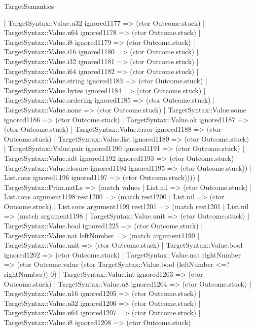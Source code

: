 \begin{lexlean}{TargetSemantics}
\begin{semanticmodule}
{            | TargetSyntax::Value.u32 ignored1177 => (ctor Outcome.stuck)
            | TargetSyntax::Value.u64 ignored1178 => (ctor Outcome.stuck)
            | TargetSyntax::Value.i8 ignored1179 => (ctor Outcome.stuck)
            | TargetSyntax::Value.i16 ignored1180 => (ctor Outcome.stuck)
            | TargetSyntax::Value.i32 ignored1181 => (ctor Outcome.stuck)
            | TargetSyntax::Value.i64 ignored1182 => (ctor Outcome.stuck)
            | TargetSyntax::Value.string ignored1183 => (ctor Outcome.stuck)
            | TargetSyntax::Value.bytes ignored1184 => (ctor Outcome.stuck)
            | TargetSyntax::Value.ordering ignored1185 => (ctor Outcome.stuck)
            | TargetSyntax::Value.none => (ctor Outcome.stuck)
            | TargetSyntax::Value.some ignored1186 => (ctor Outcome.stuck)
            | TargetSyntax::Value.ok ignored1187 => (ctor Outcome.stuck)
            | TargetSyntax::Value.error ignored1188 => (ctor Outcome.stuck)
            | TargetSyntax::Value.list ignored1189 => (ctor Outcome.stuck)
            | TargetSyntax::Value.pair ignored1190 ignored1191 => (ctor Outcome.stuck)
            | TargetSyntax::Value.adt ignored1192 ignored1193 => (ctor Outcome.stuck)
            | TargetSyntax::Value.closure ignored1194 ignored1195 => (ctor Outcome.stuck))
          | List.cons ignored1196 ignored1197 => (ctor Outcome.stuck))))
    | TargetSyntax::Prim.natLe => (match values
      | List.nil => (ctor Outcome.stuck)
      | List.cons argument1198 rest1200 => (match rest1200
        | List.nil => (ctor Outcome.stuck)
        | List.cons argument1199 rest1201 => (match rest1201
          | List.nil => (match argument1198
            | TargetSyntax::Value.unit => (ctor Outcome.stuck)
            | TargetSyntax::Value.bool ignored1225 => (ctor Outcome.stuck)
            | TargetSyntax::Value.nat leftNumber => (match argument1199
              | TargetSyntax::Value.unit => (ctor Outcome.stuck)
              | TargetSyntax::Value.bool ignored1202 => (ctor Outcome.stuck)
              | TargetSyntax::Value.nat rightNumber => (ctor Outcome.value (ctor TargetSyntax::Value.bool (leftNumber <=? rightNumber)) 0)
              | TargetSyntax::Value.int ignored1203 => (ctor Outcome.stuck)
              | TargetSyntax::Value.u8 ignored1204 => (ctor Outcome.stuck)
              | TargetSyntax::Value.u16 ignored1205 => (ctor Outcome.stuck)
              | TargetSyntax::Value.u32 ignored1206 => (ctor Outcome.stuck)
              | TargetSyntax::Value.u64 ignored1207 => (ctor Outcome.stuck)
              | TargetSyntax::Value.i8 ignored1208 => (ctor Outcome.stuck)
}
\end{semanticmodule}
\end{lexlean}
